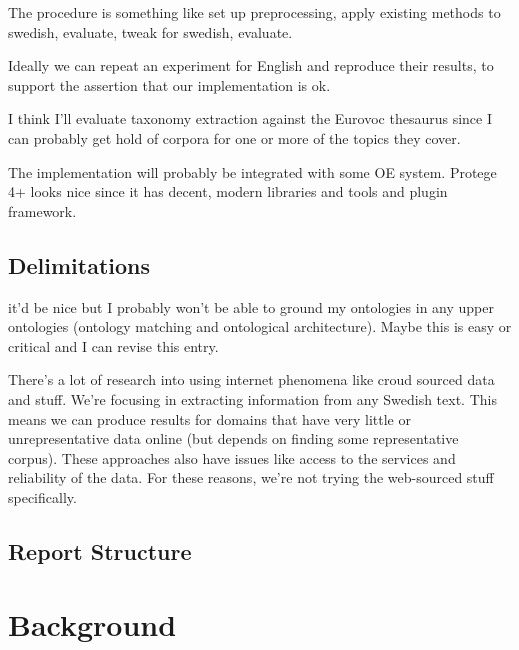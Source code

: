 \documentclass[a4paper]{report}
\begin{document}
The procedure is something like set up preprocessing, apply existing methods to swedish, evaluate, tweak for swedish, evaluate.

Ideally we can repeat an experiment for English and reproduce their results, to support the assertion that our implementation is ok.

I think I'll evaluate taxonomy extraction against the Eurovoc thesaurus since I can probably get hold of corpora for one or more of the topics they cover.

The implementation will probably be integrated with some OE system. Protege 4+ looks nice since it has decent, modern libraries and tools and plugin framework.

\section{Delimitations}

it'd be nice but I probably won't be able to ground my ontologies in any upper ontologies (ontology matching and ontological architecture). Maybe this is easy or critical and I can revise this entry.

There's a lot of research into using internet phenomena like croud sourced data and stuff. We're focusing in extracting information from any Swedish text. This means we can produce results for domains that have very little or unrepresentative data online (but depends on finding some representative corpus). These approaches also have issues like access to the services and reliability of the data. For these reasons, we're not trying the web-sourced stuff specifically.

\section{Report Structure}

\chapter{Background}
\end{document}
